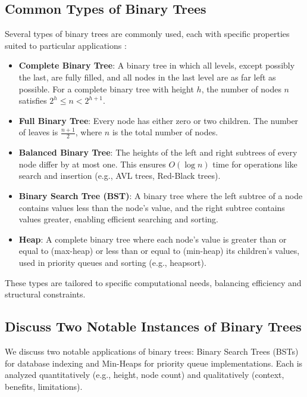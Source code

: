 \documentclass[12pt, a4paper, twoside]{report} %
\begin{document}
\subsection{Common Types of Binary Trees}

Several types of binary trees are commonly used, each with specific properties suited to particular applications \cite{rosen2019}:

\begin{itemize}
  \item \textbf{Complete Binary Tree}: A binary tree in which all levels, except possibly the last, are fully filled, and all nodes in the last level are as far left as possible. For a complete binary tree with height \( h \), the number of nodes \( n \) satisfies \( 2^h \leq n < 2^{h+1} \).
  \item \textbf{Full Binary Tree}: Every node has either zero or two children. The number of leaves is \( \frac{n+1}{2} \), where \( n \) is the total number of nodes.
  \item \textbf{Balanced Binary Tree}: The heights of the left and right subtrees of every node differ by at most one. This ensures \( O(\log n) \) time for operations like search and insertion (e.g., AVL trees, Red-Black trees).
  \item \textbf{Binary Search Tree (BST)}: A binary tree where the left subtree of a node contains values less than the node’s value, and the right subtree contains values greater, enabling efficient searching and sorting.
  \item \textbf{Heap}: A complete binary tree where each node’s value is greater than or equal to (max-heap) or less than or equal to (min-heap) its children’s values, used in priority queues and sorting (e.g., heapsort).
\end{itemize}

These types are tailored to specific computational needs, balancing efficiency and structural constraints.


\subsection{Discuss Two Notable Instances of Binary Trees}

We discuss two notable applications of binary trees: Binary Search Trees (BSTs) for database indexing and Min-Heaps for priority queue implementations. Each is analyzed quantitatively (e.g., height, node count) and qualitatively (context, benefits, limitations).
\end{document}
